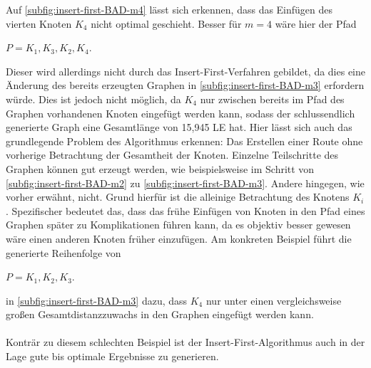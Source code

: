 Auf \vref{subfig:insert-first-BAD-m4} lässt sich erkennen, dass das Einfügen des vierten Knoten $K_4$ nicht optimal geschieht. 
Besser für $m = 4$ wäre hier der Pfad 
\begin{addmargin}[1em]{2em}
    $P=K_1, K_3, K_2, K_4$. 
    \end{addmargin}
Dieser wird allerdings nicht durch das Insert-First-Verfahren gebildet, da dies eine Änderung des bereits erzeugten Graphen in \vref{subfig:insert-first-BAD-m3} erfordern würde. 
Dies ist jedoch nicht möglich, da $K_4$ nur zwischen bereits im Pfad des Graphen vorhandenen Knoten eingefügt werden kann, sodass der schlussendlich generierte Graph eine Gesamtlänge von 15,945 \ac{LE} hat.
Hier lässt sich auch das grundlegende Problem des Algorithmus erkennen: Das Erstellen einer Route ohne vorherige Betrachtung der Gesamtheit der Knoten. 
Einzelne Teilschritte des Graphen können gut erzeugt werden, wie beispielsweise im Schritt von \vref{subfig:insert-first-BAD-m2} zu \vref{subfig:insert-first-BAD-m3}. 
Andere hingegen, wie vorher erwähnt, nicht. 
Grund hierfür ist die alleinige Betrachtung des Knotens $K_i$. 
Spezifischer bedeutet das, dass das frühe Einfügen von Knoten in den Pfad eines Graphen später zu Komplikationen führen kann, da es objektiv besser gewesen wäre einen anderen Knoten früher einzufügen.
Am konkreten Beispiel führt die generierte Reihenfolge von 
\begin{addmargin}[1em]{2em}
    $P=K_1, K_2, K_3$. 
    \end{addmargin}
in \vref{subfig:insert-first-BAD-m3} dazu, dass $K_4$ nur unter einen vergleichsweise großen Gesamtdistanzzuwachs in den Graphen eingefügt werden kann. 
\\\\
Konträr zu diesem schlechten Beispiel ist der Insert-First-Algorithmus auch in der Lage gute bis optimale Ergebnisse zu generieren. 

